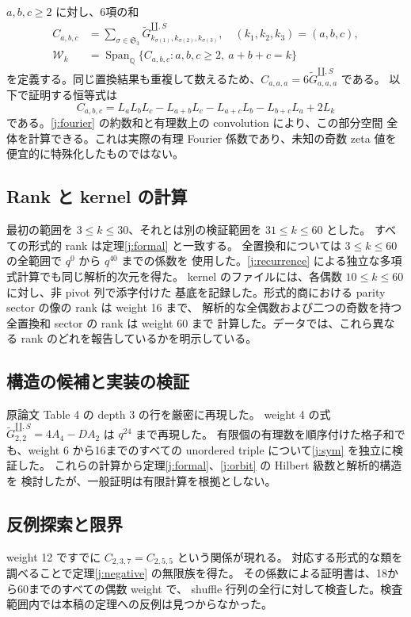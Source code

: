 \documentclass[12pt]{amsart}
\theoremstyle{definition}
\theoremstyle{remark}
\numberwithin{equation}{section}
\newcommand{\sh}{\mathbin{\amalg}}
\newcommand{\sG}[1]{\widetilde G^{\sh,S}_{#1}}
\newcommand{\Span}{\operatorname{Span}_{\mathbb Q}}
\newcommand{\WW}{\mathcal W}
\numberwithin{equation}{section}
\begin{document}
$a,b,c\ge2$ に対し、6項の和
\begin{equation}\label{j:orbitdef}
 \begin{aligned}
 C_{a,b,c}&=\sum_{\sigma\in\mathfrak S_3}
          \sG{k_{\sigma(1)},k_{\sigma(2)},k_{\sigma(3)}},
 \quad (k_1,k_2,k_3)=(a,b,c),\\
 \WW_k&=\Span\{C_{a,b,c}:a,b,c\ge2,\ a+b+c=k\}
 \end{aligned}
\end{equation}
を定義する。同じ置換結果も重複して数えるため、$C_{a,a,a}=6\sG{a,a,a}$ である。
以下で証明する恒等式は
\begin{equation}\label{j:sym}
 C_{a,b,c}=L_aL_bL_c-L_{a+b}L_c-L_{a+c}L_b-L_{b+c}L_a+2L_k
\end{equation}
である。\eqref{j:fourier} の約数和と有理数上の convolution により、この部分空間
全体を計算できる。これは実際の有理 Fourier 係数であり、未知の奇数 zeta 値を
便宜的に特殊化したものではない。

\subsection{Rank と kernel の計算}
最初の範囲を $3\le k\le30$、それとは別の検証範囲を $31\le k\le60$ とした。
すべての形式的 rank は定理\ref{j:formal} と一致する。
全置換和については $3\le k\le60$ の全範囲で $q^0$ から $q^{40}$ までの係数を
使用した。\eqref{j:recurrence} による独立な多項式計算でも同じ解析的次元を得た。
kernel のファイルには、各偶数 $10\le k\le60$ に対し、非 pivot 列で添字付けた
基底を記録した。形式的商における parity sector の像の rank は weight 16 まで、
解析的な全偶数および二つの奇数を持つ全置換和 sector の rank は weight 60 まで
計算した。データでは、これら異なる rank のどれを報告しているかを明示している。

\subsection{構造の候補と実装の検証}
原論文 Table 4 の depth 3 の行を厳密に再現した。
weight 4 の式 $\sG{2,2}=4A_4-D A_2$ は $q^{24}$ まで再現した。
有限個の有理数を順序付けた格子和でも、weight 6 から16までのすべての unordered
triple について\eqref{j:sym} を独立に検証した。
これらの計算から定理\ref{j:formal}、\ref{j:orbit} の Hilbert 級数と解析的構造を
検討したが、一般証明は有限計算を根拠としない。

\subsection{反例探索と限界}
weight 12 ですでに $C_{2,3,7}=C_{2,5,5}$ という関係が現れる。
対応する形式的な類を調べることで定理\ref{j:negative} の無限族を得た。
その係数による証明書は、18から60までのすべての偶数 weight で、
shuffle 行列の全行に対して検査した。検査範囲内では本稿の定理への反例は見つからなかった。
\end{document}
